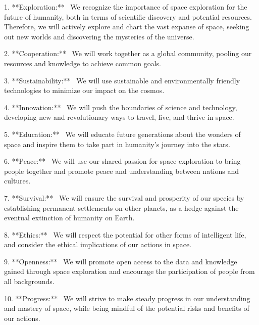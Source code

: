 
1.	**Exploration:** \
We recognize the importance of space exploration for the future of humanity, both in terms of scientific discovery and potential resources.
Therefore, we will actively explore and chart the vast expanse of space, seeking out new worlds and discovering the mysteries of the universe.


2.	**Cooperation:** \
We will work together as a global community, pooling our resources and knowledge to achieve common goals.

3.	**Sustainability:** \
We will use sustainable and environmentally friendly technologies to minimize our impact on the cosmos.

4.	**Innovation:** \
We will push the boundaries of science and technology, developing new and revolutionary ways to travel, live, and thrive in space.

5.	**Education:** \
We will educate future generations about the wonders of space and inspire them to take part in humanity's journey into the stars.

6.	**Peace:** \
We will use our shared passion for space exploration to bring people together and promote peace and understanding between nations and cultures.

7.	**Survival:** \
We will ensure the survival and prosperity of our species by establishing permanent settlements on other planets, as a hedge against the eventual extinction of humanity on Earth.

8.	**Ethics:** \
We will respect the potential for other forms of intelligent life, and consider the ethical implications of our actions in space.

9.	**Openness:** \
We will promote open access to the data and knowledge gained through space exploration and encourage the participation of people from all backgrounds.

10.	**Progress:** \
We will strive to make steady progress in our understanding and mastery of space, while being mindful of the potential risks and benefits of our actions.
